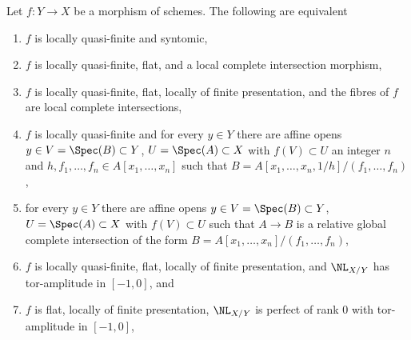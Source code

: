 \begin{lemma}
\label{lemma-syntomic-quasi-finite}
Let $f : Y \to X$ be a morphism of schemes. The following are equivalent
\begin{enumerate}
\item $f$ is locally quasi-finite and syntomic,
\item $f$ is locally quasi-finite, flat, and a local complete intersection
morphism,
\item $f$ is locally quasi-finite, flat, locally of finite presentation,
and the fibres of $f$ are local complete intersections,
\item $f$ is locally quasi-finite and for every $y \in Y$ there are
affine opens $y \in V = \Spec(B) \subset Y$, $U = \Spec(A) \subset X$
with $f(V) \subset U$ an integer $n$ and
$h, f_1, \ldots, f_n \in A[x_1, \ldots, x_n]$ such that
$B = A[x_1, \ldots, x_n, 1/h]/(f_1, \ldots, f_n)$,
\item for every $y \in Y$ there are affine opens
$y \in V = \Spec(B) \subset Y$, $U = \Spec(A) \subset X$
with $f(V) \subset U$ such that $A \to B$ is a relative global complete
intersection of the form $B = A[x_1, \ldots, x_n]/(f_1, \ldots, f_n)$,
\item $f$ is locally quasi-finite, flat, locally of finite presentation,
and $\NL_{X/Y}$ has tor-amplitude in $[-1, 0]$, and
\item $f$ is flat, locally of finite presentation,
$\NL_{X/Y}$ is perfect of rank $0$ with tor-amplitude in $[-1, 0]$,
\end{enumerate}
\end{lemma}


